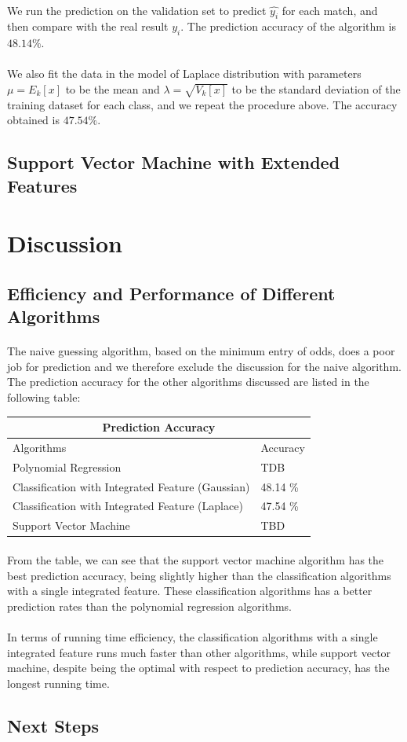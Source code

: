 \documentclass[12pt]{article}
\begin{document}
\paragraph{}
We run the prediction on the validation set to predict $\hat{y_i}$ for each match, and then compare with the real result $y_i$. The prediction accuracy of the algorithm is $48.14 \%$.
\paragraph{}
We also fit the data in the model of Laplace distribution with parameters $\mu = 
E_k[x]$ to be the mean and $\lambda = \sqrt{V_k[x]}$ to be the standard deviation of the training dataset for each class, and we repeat the procedure above. The accuracy obtained is $47.54\%$.
\subsection{Support Vector Machine with Extended Features}
\section{Discussion}
\subsection{Efficiency and Performance of Different Algorithms}
\paragraph{}
The naive guessing algorithm, based on the minimum entry of odds, does a poor job for prediction and we therefore exclude the discussion for the naive algorithm. The prediction accuracy for the other algorithms discussed are listed in the following table:
\newline
\begin{tabular}{ |p{9cm}|p{2cm}|  }
	\hline
	\multicolumn{2}{|c|}{Prediction Accuracy} \\
	\hline
	Algorithms & Accuracy \\
	\hline
	Polynomial Regression & TDB \\ 
	Classification with Integrated Feature (Gaussian) & 48.14 \% \\
	Classification with Integrated Feature (Laplace) & 47.54 \% \\
	Support Vector Machine & TBD \\
	\hline
\end{tabular}
\paragraph{}
From the table, we can see that the support vector machine algorithm has the best prediction accuracy, being slightly higher than the classification algorithms with a single integrated feature. These classification algorithms has a better prediction rates than the polynomial regression algorithms.
\paragraph{}
In terms of running time efficiency, the classification algorithms with a single integrated feature runs much faster than other algorithms, while support vector machine, despite being the optimal with respect to prediction accuracy, has the longest running time.
\subsection{Next Steps}
\end{document}
